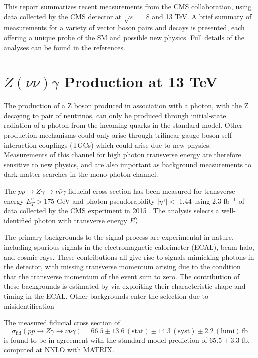 \documentclass[10pt]{article}
\begin{document}
This report summarizes recent measurements from the CMS collaboration, using
data collected by the CMS detector at $\sqrt{s} =$ 8 and 13 TeV. A brief summary
of measurements for a variety of vector boson pairs and decays is presented, 
each offering a unique probe of the SM and possible new physics. Full details of 
the analyses can be found in the references.

\section{$Z(\nu\nu)\gamma$ Production at 13 TeV}
The production of a Z boson produced in association with a photon,
with the Z decaying to pair of neutrinos, can only be produced through
initial-state radiation of a photon from the incoming quarks in the standard model.
Other production mechanisms could only arise through trilinear gauge boson 
self-interaction couplings (TGCs) which could arise due to new physics. 
Measurements of this channel for high photon transverse energy are therefore
sensitive to new physics, and are also important as background measurements to
dark matter searches in the mono-photon channel.

The $pp \rightarrow Z\gamma \rightarrow \nu\bar{\nu}\gamma$ fiducial cross section 
has been measured for transverse energy $E_{T}^{\gamma} > 175$ GeV and photon pseudorapidity
$\lvert\eta^{\gamma}\rvert < $ 1.44 using 2.3 fb$^{-1}$ of data collected by the CMS experiment in 2015
\cite{CMS-PAS-SMP-16-004}.
The analysis selects a well-identified photon with transverse energy $E_{T}^{\gamma}$

The primary backgrounds to the signal process are experimental in nature, including 
spurious signals in the electromagnetic calorimeter (ECAL), beam halo, and cosmic rays. 
These contributions all give rise to signals mimicking photons in the detector, 
with missing transverse momentum arising due to the 
condition that the transverse momentum of the event sum to zero. The contribution of
these backgrounds is estimated
by via exploiting their characteristic shape and timing in the ECAL. Other backgrounds 
enter the selection due to misidentification

The measured fiducial cross section of
\begin{equation}
  \sigma_{\mathrm{fid}}(pp \rightarrow Z\gamma \rightarrow \nu\bar{\nu}\gamma) = 66.5 \pm 13.6 \, \mathrm{(stat)} \pm 14.3 \, 
        \mathrm{(syst)} \pm 2.2 \, \mathrm{(lumi)} \,\mathrm{fb}
\end{equation}
is found to be in agreement with the standard model prediction of $65.5 \pm 3.3$ fb, computed at
NNLO with MATRIX. \cite{bleh}
\end{document}
